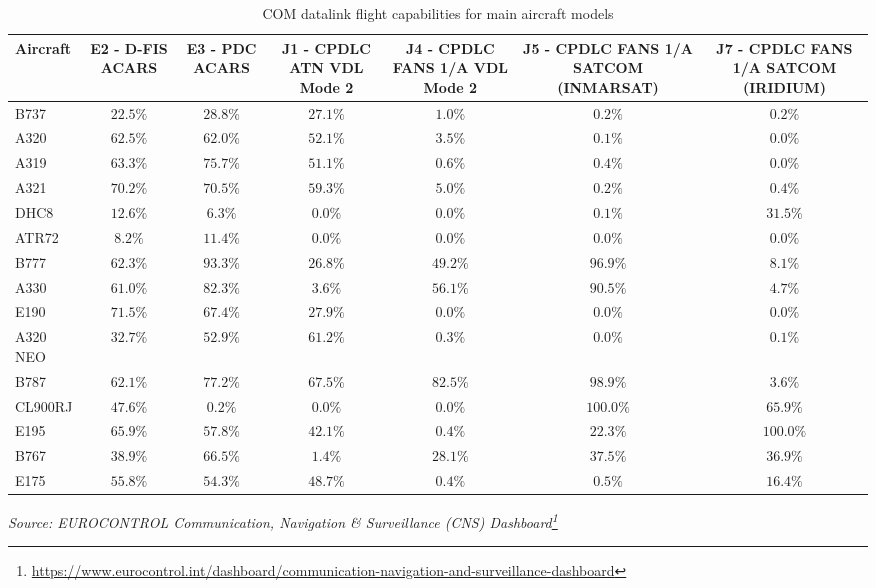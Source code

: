\documentclass[
  11pt,
  a4paper,
]{book}
\DeclareRobustCommand{\href}[2]{#2\footnote{\url{#1}}}
\begin{document}
\hypertarget{tbl-com-aircraft}{}
\setlength{\LTpost}{0mm}
\begin{longtable}{lcccccc}
\caption{\label{tbl-com-aircraft}COM datalink flight capabilities for main aircraft models }\tabularnewline

\toprule
Aircraft & E2 - D-FIS ACARS & E3 - PDC ACARS & J1 - CPDLC ATN VDL Mode 2 & J4 - CPDLC FANS 1/A VDL Mode 2 & J5 - CPDLC FANS 1/A SATCOM (INMARSAT) & J7 - CPDLC FANS 1/A SATCOM (IRIDIUM) \\ 
\midrule
B737 & $22.5\%$ & $28.8\%$ & $27.1\%$ & $1.0\%$ & $0.2\%$ & $0.2\%$ \\ 
A320 & $62.5\%$ & $62.0\%$ & $52.1\%$ & $3.5\%$ & $0.1\%$ & $0.0\%$ \\ 
A319 & $63.3\%$ & $75.7\%$ & $51.1\%$ & $0.6\%$ & $0.4\%$ & $0.0\%$ \\ 
A321 & $70.2\%$ & $70.5\%$ & $59.3\%$ & $5.0\%$ & $0.2\%$ & $0.4\%$ \\ 
DHC8 & $12.6\%$ & $6.3\%$ & $0.0\%$ & $0.0\%$ & $0.1\%$ & $31.5\%$ \\ 
ATR72 & $8.2\%$ & $11.4\%$ & $0.0\%$ & $0.0\%$ & $0.0\%$ & $0.0\%$ \\ 
B777 & $62.3\%$ & $93.3\%$ & $26.8\%$ & $49.2\%$ & $96.9\%$ & $8.1\%$ \\ 
A330 & $61.0\%$ & $82.3\%$ & $3.6\%$ & $56.1\%$ & $90.5\%$ & $4.7\%$ \\ 
E190 & $71.5\%$ & $67.4\%$ & $27.9\%$ & $0.0\%$ & $0.0\%$ & $0.0\%$ \\ 
A320 NEO & $32.7\%$ & $52.9\%$ & $61.2\%$ & $0.3\%$ & $0.0\%$ & $0.1\%$ \\ 
B787 & $62.1\%$ & $77.2\%$ & $67.5\%$ & $82.5\%$ & $98.9\%$ & $3.6\%$ \\ 
CL900RJ & $47.6\%$ & $0.2\%$ & $0.0\%$ & $0.0\%$ & $100.0\%$ & $65.9\%$ \\ 
E195 & $65.9\%$ & $57.8\%$ & $42.1\%$ & $0.4\%$ & $22.3\%$ & $100.0\%$ \\ 
B767 & $38.9\%$ & $66.5\%$ & $1.4\%$ & $28.1\%$ & $37.5\%$ & $36.9\%$ \\ 
E175 & $55.8\%$ & $54.3\%$ & $48.7\%$ & $0.4\%$ & $0.5\%$ & $16.4\%$ \\ 
\bottomrule
\end{longtable}
\begin{minipage}{\linewidth}
\emph{Source: \href{https://www.eurocontrol.int/dashboard/communication-navigation-and-surveillance-dashboard}{EUROCONTROL Communication, Navigation \& Surveillance (CNS) Dashboard}}\\
\end{minipage}
\end{document}
